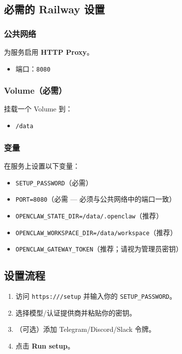 \subsection{必需的 Railway 设置}


\subsubsection{公共网络}


为服务启用 \textbf{HTTP Proxy}。

\begin{itemize}
  \item 端口：\texttt{8080}
\end{itemize}


\subsubsection{Volume（必需）}


挂载一个 Volume 到：

\begin{itemize}
  \item \texttt{/data}
\end{itemize}


\subsubsection{变量}


在服务上设置以下变量：

\begin{itemize}
  \item \texttt{SETUP\_PASSWORD}（必需）
  \item \texttt{PORT=8080}（必需 — 必须与公共网络中的端口一致）
  \item \texttt{OPENCLAW\_STATE\_DIR=/data/.openclaw}（推荐）
  \item \texttt{OPENCLAW\_WORKSPACE\_DIR=/data/workspace}（推荐）
  \item \texttt{OPENCLAW\_GATEWAY\_TOKEN}（推荐；请视为管理员密钥）
\end{itemize}


\subsection{设置流程}


\begin{enumerate}
  \item 访问 \texttt{https:///setup} 并输入你的 \texttt{SETUP\_PASSWORD}。
  \item 选择模型/认证提供商并粘贴你的密钥。
  \item （可选）添加 Telegram/Discord/Slack 令牌。
  \item 点击 \textbf{Run setup}。
\end{enumerate}



